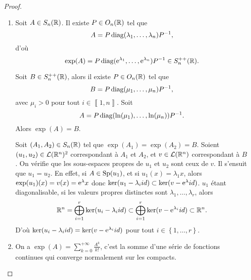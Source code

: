\documentclass[12pt]{article}
\begin{document}
\begin{proof}
	\phantom{}
	\begin{enumerate}
		\item Soit $A\in S_n(\mathbb{R})$. Il existe $P\in O_n(\mathbb{R})$ tel que 
		\begin{equation}
			A=P\operatorname{diag}(\lambda_{1},\dots,\lambda_{n})P^{-1},
		\end{equation}
		d'où 
		\begin{equation}
			\exp(A)=P\operatorname{diag}(\mathrm{e}^{\lambda_{1}},\dots,\mathrm{e}^{\lambda_{n}})P^{-1} \in S_n^{++}(\mathbb{R}).
		\end{equation}

		Soit $B\in S_n^{++}(\mathbb{R})$, alors il existe $P\in O_n(\mathbb{R})$ tel que 
		\begin{equation}
			B=P\operatorname{diag}(\mu_{1},\dots,\mu_{n})P^{-1},
		\end{equation}
		avec $\mu_{i}>0$ pour tout $i\in\left\llbracket 1,n\right\rrbracket$. Soit 
		\begin{equation}
			A=P\operatorname{diag}(\ln(\mu_{1}),\dots,\ln(\mu_{n}))P^{-1}.
		\end{equation}
		Alors $\exp(A)=B$.

		Soit $(A_{1},A_{2})\in S_n(\mathbb{R})$ tel que $\exp(A_1)=\exp(A_2)=B$. Soient $(u_1,u_2)\in\mathcal{L}(\mathbb{R}^{n})^{2}$ correspondant à $A_1$ et $A_2$, et $v\in\mathcal{L}(\mathbb{R}^{n})$ correspondant à $B$. On vérifie que les sous-espaces propres de $u_1$ et $u_2$ sont ceux de $v$. Il s'ensuit que $u_1=u_2$. En effet, si $A\in\operatorname{Sp}(u_1)$, et si $u_1(x)=\lambda_{1}x$, alors $\exp(u_1)(x)=v(x)=\mathrm{e}^{\lambda}x$ donc $\ker(u_1-\lambda_i id)\subset\ker(v-\mathrm{e}^{\lambda}id)$. $u_1$ étant diagonalisable, si les valeurs propres distinctes sont $\lambda_{1},\dots,\lambda_{r}$, alors 
		\begin{equation}
			\mathbb{R}^{n}=\bigoplus_{i=1}^{r}\ker(u_i-\lambda_i id)\subset\bigoplus_{i=1}^{r}\ker(v-\mathrm{e}^{\lambda_i}id)\subset\mathbb{R}^{n}.
		\end{equation}
		D'où $\ker(u_i-\lambda_i id)=\ker(v-\mathrm{e}^{\lambda_i}id)$ pour tout $i\in\left\lbrace 1,\dots,r\right\rbrace$.

		\item On a $\exp(A)=\sum_{k=0}^{+\infty}\frac{A^{k}}{k!}$, c'est la somme d'une série de fonctions continues qui converge normalement sur les compacts.
		

\end{enumerate}
\end{proof}
\end{document}
